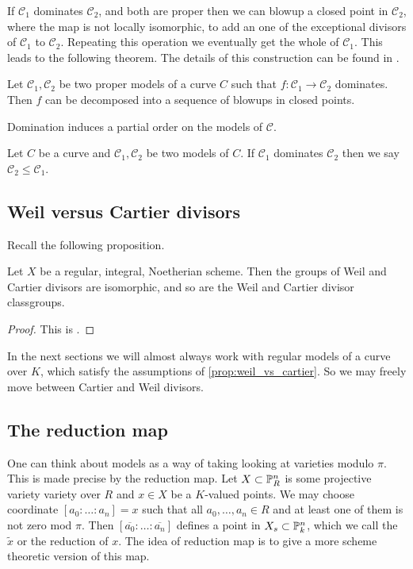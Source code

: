 If $\mathscr C_1 $ dominates $\mathscr C_2$, and both are proper then we can blowup a closed point in $\mathscr C_2$, where the map is not locally isomorphic, to add an one of the exceptional divisors of $\mathscr C_1$ to $\mathscr C_2$. 
Repeating this operation we eventually get the whole of $\mathscr C_1$. 
This leads to the following theorem. The details of this construction can be found in \cite[sec.\ 9.1.2]{liuAlgebraicGeometryArithmetic2002}.
\begin{theorem}\label{thm:factorisation_theorem}
	Let $\mathscr C_1, \mathscr C_2$ be two proper models of a curve $C$ such that $f: \mathscr C_1 \to \mathscr C_2$ dominates. 
	Then $f$ can be decomposed into a sequence of blowups in closed points. 
\end{theorem}

Domination induces a partial order on the models of $\mathscr C$. 
\begin{definition}
	Let $C$ be a curve and $\mathscr C_1, \mathscr C_2$ be two models of $C$. 
	If $\mathscr C_1$ dominates $\mathscr C_2$ then we say $\mathscr C_2 \le \mathscr C_1$.
\end{definition}





\subsection{Weil versus Cartier divisors} \label{sec:weil_versus_cartier_divisors}

Recall the following proposition. 
\begin{proposition}\label{prop:weil_vs_cartier}
	Let $X$ be a regular, integral, Noetherian scheme. Then the groups of Weil and Cartier divisors are isomorphic, and so are the Weil and Cartier divisor classgroups. 
\end{proposition}
\begin{proof}
	This is \cite[prop.\ 7.2.16]{liuAlgebraicGeometryArithmetic2002}. 
\end{proof}

In the next sections we will almost always work with regular models of a curve over $K$, which satisfy the assumptions of \cref{prop:weil_vs_cartier}. So we may freely move between Cartier and Weil divisors. 

\subsection{The reduction map} \label{sec:the_reduction_map_models}
One can think about models as a way of taking looking at varieties modulo $\pi$. 
This is made precise by the reduction map. 
Let $ X\subset \mathbb{P}^{n}_R$ is some projective variety variety over $R$ and $x \in X$ be a $K$-valued points. 
We may choose coordinate $[a_0:\ldots:a_n] = x$ such that all $a_0, \ldots, a_n \in R$ and at least one of them is not zero mod $\pi$.  
Then $[\overline{a_0}: \ldots :\overline{a_n}]$ defines a point in $X_s \subset  \mathbb{P}^{n}_k$, which we call the $\tilde x$ or the reduction of $x$.  
The idea of reduction map is to give a more scheme theoretic version of this map. 

